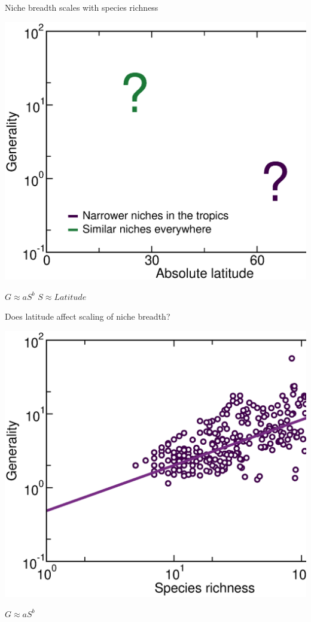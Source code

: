 \documentclass{beamer}
\begin{document}
 \begin{frame}{Niche breadth scales with species richness}

    \begin{center}
      \includegraphics*[width=.654\textwidth]{Figures/results/Gen_vs_lat_negative.eps}

    \vspace{.3cm}
      {\Large      
      $G \approx aS^b$ \hspace{.5in} $S \approx Latitude$}
    \end{center}

  \end{frame}


  \begin{frame}{Does latitude affect scaling of niche breadth?}

    \begin{center}
      \includegraphics*[width=.654\textwidth]{Figures/results/Gen_dots_vs_S_fitline_observed.eps}

    \vspace{.3cm}
      {\Large      
      $G \approx aS^b$}
    \end{center}
  \end{frame}
\end{document}
